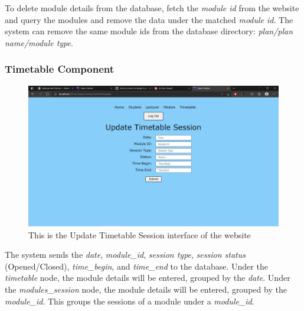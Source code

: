 \documentclass[../report.tex]{subfiles}
\begin{document}


To delete module details from the database, fetch the \textit{module id} from the website and query the modules and remove the data under the matched \textit{module id}. The system can remove the same module ids from the database directory: \textit{plan/plan name/module type}. 

\bigskip
\subsubsection{Timetable Component}
\begin{figure}[H]
	\centering
	\includegraphics[width=.7\linewidth]{../images/07/01-06-timetable.png}
	\caption{This is the Update Timetable Session interface of the website}
	\label{fig:07-01-06-timetable}
\end{figure}



The system sends the \textit{date}, \textit{module\_id}, \textit{session type}, \textit{session status} (Opened/Closed), \textit{time\_begin}, and \textit{time\_end} to the database. Under the \textit{timetable} node, the module details will be entered, grouped by the \textit{date}. Under the \textit{modules\_session} node, the module details will be entered, grouped by the \textit{module\_id}. This groups the sessions of a module under a \textit{module\_id}.

\bigskip
\end{document}
